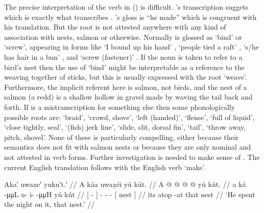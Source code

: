 The precise interpretation of the verb in (\lastx) is difficult.
\citeauthor{swanton:1909}’s transcription  suggets  which is exactly what \citeauthor{leer:1977} transcribes \parencite[17]{leer:1977}.
\citeauthor{swanton:1909}’s gloss is “he made” which is congruent with his translation.
But the root  is not attested anywhere with any kind of association with nests, salmon or otherwise.
Normally  is glossed as ‘bind’ or ‘screw’, appearing in forms like  ‘I bound up his hand’ \parencite[30.217]{story-naish:1973},  ‘people tied a raft’ \parencite[230.3262]{story-naish:1973},  ‘s/he has hair in a bun’ \parencite[09/232]{leer:1973}, and  ‘screw (fastener)’ \parencite[\textsc{t}·32]{leer:2001}.
If the noun  is taken to refer to a bird’s nest then the use of  ‘bind’ might be interpretable as a reference to the weaving together of sticks, but this is usually expressed with the root  ‘weave’.
Furthermore, the implicit referent here is salmon, not birds, and the nest of a salmon (a redd) is a shallow hollow in gravel made by waving the tail back and forth.
If  is a mistranscription for something else then some phonologically possible roots are:  ‘braid’,  ‘crowd, shove’,  ‘left (handed)’,  ‘flense’,  ‘full of liquid’,  ‘close tightly, seal’,  ‘(fish) jerk line’,  ‘slide, slit, dorsal fin’,  ‘tail’,  ‘throw away, pitch, shovel’.
None of these is particularly compelling, either because their semantics does not fit with salmon nests or because they are only nominal and not attested in verb forms.
Further investigation is needed to make sense of .
The current English translation follows \citeauthor{swanton:1909} with the English verb ‘make’.

\ex\label{ex:91-30-overnight-on-nest}%
%
\begingl
	\glpreamble	Aka′ uwaxe′ yuku′t.′ //
	\glpreamble	A káa uwax̱éi yú kút. //
	\gla	{} A  @ {} {}
		 @ {} @ {} @ {}
		{} yú kút. {} //
	\glb	{} a ká -μμL {}
		u- i-  -μμH
		{} yú kút {} //
	\glc	{}[   - {}]
		- -  -
		{}[  nest {}] //
	\gld	{} its atop -at {}
		 {} {} {}
		{} that nest {} //
	\glft	‘He spent the night on it, that nest.’
		//
\endgl
\xe

